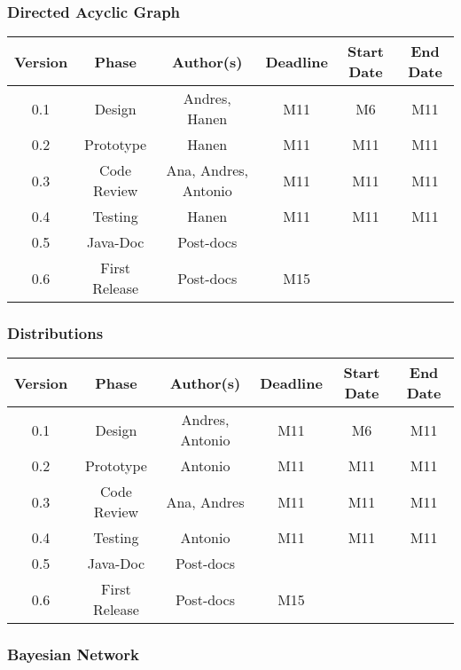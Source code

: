\subsubsection*{Directed Acyclic Graph}

\begin{table}[H]
\begin{tabular}{cccccc}
\hline
\textbf{Version} & \textbf{Phase} & \textbf{Author(s)} & \textbf{Deadline} & \textbf{Start Date} & \textbf{End Date}\\
\hline
0.1 & Design & Andres, Hanen & M11  & M6 & M11\\
\hline 
0.2 & Prototype & Hanen & M11 & M11 & M11\\
\hline 
0.3 & Code Review & Ana, Andres, Antonio & M11 & M11 & M11\\
\hline 
0.4 & Testing & Hanen & M11 & M11 & M11\\
\hline 
0.5 & Java-Doc  & Post-docs &  &  & \\
\hline 
0.6 & First Release & Post-docs & M15 &  & \\
\hline
\end{tabular}
\end{table}


\subsubsection*{Distributions}
\begin{table}[H]
\begin{tabular}{cccccc}
\hline
\textbf{Version} & \textbf{Phase} & \textbf{Author(s)} & \textbf{Deadline} & \textbf{Start Date} & \textbf{End Date}\\
\hline
0.1 & Design & Andres, Antonio &  M11 & M6 & M11\\
\hline 
0.2 & Prototype & Antonio & M11  & M11 & M11\\
\hline 
0.3 & Code Review & Ana, Andres & M11 & M11 & M11\\
\hline 
0.4 & Testing &  Antonio & M11  & M11  & M11\\
\hline 
0.5 & Java-Doc  & Post-docs &  &  & \\
\hline 
0.6 & First Release & Post-docs & M15 &  & \\
\hline
\end{tabular}
\end{table}


\subsubsection*{Bayesian Network}

